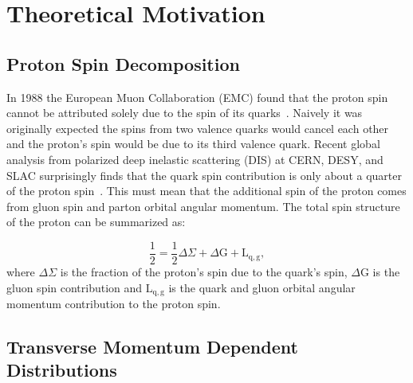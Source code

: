 \section{Theoretical Motivation}
\subsection{Proton Spin Decomposition}
In 1988 the European Muon Collaboration (EMC) found that the proton
spin cannot be attributed solely due to the spin of its
quarks~\cite{EMC_spin}.  Naively it was originally expected the spins
from two valence quarks would cancel each other and the proton's spin
would be due to its third valence quark.  Recent global analysis from
polarized deep inelastic scattering (DIS) at CERN, DESY, and SLAC
surprisingly finds that the quark spin contribution is only about a
quarter of the proton spin~\cite{Spin_globalAnalysis}.  This must mean
that the additional spin of the proton comes from gluon spin and
parton orbital angular momentum.  The total spin structure of the
proton can be summarized as:

\begin{equation}
  \frac{1}{2} = \frac{1}{2}\Delta \Sigma + \Delta \mathrm{G} + \mathrm{L}_{\mathrm{q,g}},
  \label{equ:proton_spin}%
\end{equation}
%
where $\Delta \Sigma$ is the fraction of the proton's spin due to the
quark's spin, $\Delta \mathrm{G}$ is the gluon spin contribution and
$\mathrm{L}_{\mathrm{q,g}}$ is the quark and gluon orbital angular
momentum contribution to the proton spin.


\subsection{Transverse Momentum Dependent Distributions}


